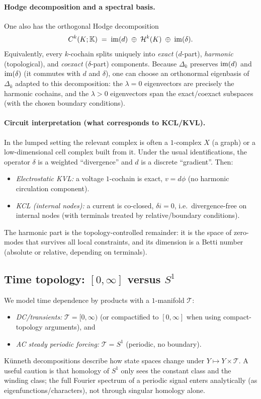 \documentclass[11pt]{article}
\begin{document}
\paragraph{Hodge decomposition and a spectral basis.}
One also has the orthogonal Hodge decomposition
\[
C^k(K;\mathbb{K}) \;=\; \mathrm{im}(d)\;\oplus\;\mathcal{H}^k(K)\;\oplus\;\mathrm{im}(\delta).
\]
Equivalently, every $k$-cochain splits uniquely into \emph{exact} ($d$-part), \emph{harmonic} (topological), and \emph{coexact} ($\delta$-part) components.
Because $\Delta_k$ preserves $\mathrm{im}(d)$ and $\mathrm{im}(\delta)$ (it commutes with $d$ and $\delta$), one can choose an orthonormal eigenbasis of $\Delta_k$ adapted to this decomposition:
the $\lambda=0$ eigenvectors are precisely the harmonic cochains, and the $\lambda>0$ eigenvectors span the exact/coexact subspaces (with the chosen boundary conditions).

\paragraph{Circuit interpretation (what corresponds to KCL/KVL).}
In the lumped setting the relevant complex is often a $1$-complex $X$ (a graph) or a low-dimensional cell complex built from it.
Under the usual identifications, the operator $\delta$ is a weighted ``divergence'' and $d$ is a discrete ``gradient''.
Then:
\begin{itemize}
  \item \emph{Electrostatic KVL:} a voltage $1$-cochain is exact, $v=d\phi$ (no harmonic circulation component).
  \item \emph{KCL (internal nodes):} a current is co-closed, $\delta i=0$, i.e.\ divergence-free on internal nodes (with terminals treated by relative/boundary conditions).
\end{itemize}
The harmonic part is the topology-controlled remainder: it is the space of zero-modes that survives all local constraints, and its dimension is a Betti number (absolute or relative, depending on terminals).

\subsection{\texorpdfstring{Time topology: $[0,\infty]$ versus $S^1$}{Time topology: interval versus circle}}
We model time dependence by products with a $1$-manifold $\mathcal{T}$:
\begin{itemize}
  \item \emph{DC/transients:} $\mathcal{T}=[0,\infty)$ (or compactified to $[0,\infty]$ when using compact-topology arguments), and
  \item \emph{AC steady periodic forcing:} $\mathcal{T}=S^1$ (periodic, no boundary).
\end{itemize}
K\"unneth decompositions describe how state spaces change under $Y\mapsto Y\times \mathcal{T}$.
A useful caution is that homology of $S^1$ only sees the constant class and the winding class; the full Fourier spectrum of a periodic signal enters analytically (as eigenfunctions/characters), not through singular homology alone.
\end{document}
